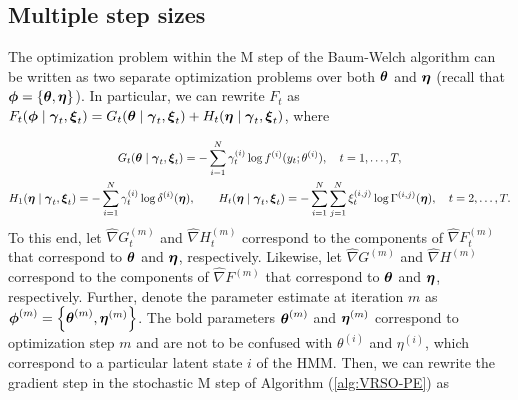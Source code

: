



\subsection{Multiple step sizes}

The optimization problem within the M step of the Baum-Welch algorithm can be written as two separate optimization problems over both $\boldsymbol{\theta}$ and $\boldsymbol{\eta}$ (recall that $\boldsymbol{\phi} = \{\boldsymbol{\theta},\boldsymbol{\eta}\}$). In particular, we can rewrite $F_t$ as $F_t(\boldsymbol{\phi} \mid  \boldsymbol{\gamma}_t,  \boldsymbol{\xi}_t) = G_t(\boldsymbol{\theta} \mid  \boldsymbol{\gamma}_t,  \boldsymbol{\xi}_t) + H_t(\boldsymbol{\eta} \mid  \boldsymbol{\gamma}_t,  \boldsymbol{\xi}_t)$, where

\begin{gather}
    G_t(\boldsymbol{\theta} \mid  \boldsymbol{\gamma}_t,  \boldsymbol{\xi}_t) = - \sum_{i=1}^N  \gamma^{(i)}_t \log f^{(i)}(y_t;\theta^{(i)}), \quad t = 1,\ldots,T, \\
    H_1(\boldsymbol{\eta} \mid  \boldsymbol{\gamma}_t,  \boldsymbol{\xi}_t) = - \sum_{i=1}^N  \gamma^{(i)}_t \log \delta^{(i)}(\boldsymbol{\eta}), \qquad H_t(\boldsymbol{\eta} \mid  \boldsymbol{\gamma}_t,  \boldsymbol{\xi}_t) =  - \sum_{i=1}^N \sum_{j=1}^N  \xi^{(i,j)}_t \log \Gamma^{(i,j)}(\boldsymbol{\eta}), \quad t = 2,\ldots,T.
\end{gather}
%
To this end, let $\widehat \nabla G^{(m)}_{t}$ and $\widehat \nabla H^{(m)}_{t}$ correspond to the components of $\widehat \nabla F^{(m)}_{t}$ that correspond to $\boldsymbol{\theta}$ and $\boldsymbol{\eta}$, respectively. Likewise, let $\widehat \nabla G^{(m)}$ and $\widehat \nabla H^{(m)}$ correspond to the components of $\widehat \nabla F^{(m)}$ that correspond to $\boldsymbol{\theta}$ and $\boldsymbol{\eta}$, respectively. Further, denote the parameter estimate at iteration $m$ as $\boldsymbol{\phi}^{(m)} = \left\{\boldsymbol{\theta}^{(m)}, \boldsymbol{\eta}^{(m)}\right\}$. The bold parameters $\boldsymbol{\theta}^{(m)}$ and $\boldsymbol{\eta}^{(m)}$ correspond to optimization step $m$ and are not to be confused with $\theta^{(i)}$ and $\eta^{(i)}$, which correspond to a particular latent state $i$ of the HMM. Then, we can rewrite the gradient step in the stochastic M step of Algorithm (\ref{alg:VRSO-PE}) as

